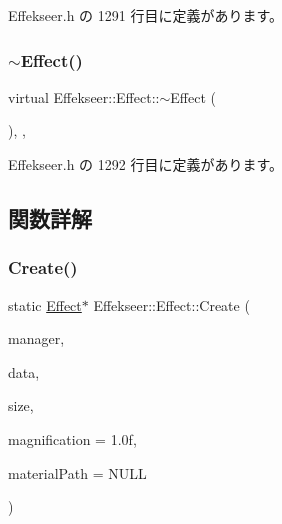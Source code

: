  Effekseer.\+h の 1291 行目に定義があります。

\mbox{\label{class_effekseer_1_1_effect_aeff1be44efe48d64e2b398d9186c1011}} 
\subsubsection{\texorpdfstring{$\sim$\+Effect()}{~Effect()}}
{\footnotesize\ttfamily virtual Effekseer\+::\+Effect\+::$\sim$\+Effect (\begin{DoxyParamCaption}{ }\end{DoxyParamCaption})\hspace{0.3cm}{\ttfamily [inline]}, {\ttfamily [protected]}, {\ttfamily [virtual]}}



 Effekseer.\+h の 1292 行目に定義があります。



\subsection{関数詳解}
\mbox{\label{class_effekseer_1_1_effect_a405ce55b658846f21963f39d8f4bda12}} 
\subsubsection{\texorpdfstring{Create()}{Create()}\hspace{0.1cm}{\footnotesize\ttfamily [1/4]}}
{\footnotesize\ttfamily static \mbox{\hyperlink{class_effekseer_1_1_effect}{Effect}}$\ast$ Effekseer\+::\+Effect\+::\+Create (\begin{DoxyParamCaption}\item[{\mbox{\hyperlink{class_effekseer_1_1_manager}{Manager}} $\ast$}]{manager,  }\item[{\mbox{\hyperlink{namespace_effekseer_ab34c4088e512200cf4c2716f168deb56}{void}} $\ast$}]{data,  }\item[{int32\+\_\+t}]{size,  }\item[{float}]{magnification = {\ttfamily 1.0f},  }\item[{const \mbox{\hyperlink{_effekseer_8h_a50b026abea014b47854bcd835b3b6233}{E\+F\+K\+\_\+\+C\+H\+AR}} $\ast$}]{material\+Path = {\ttfamily NULL} }\end{DoxyParamCaption})\hspace{0.3cm}{\ttfamily [static]}}



